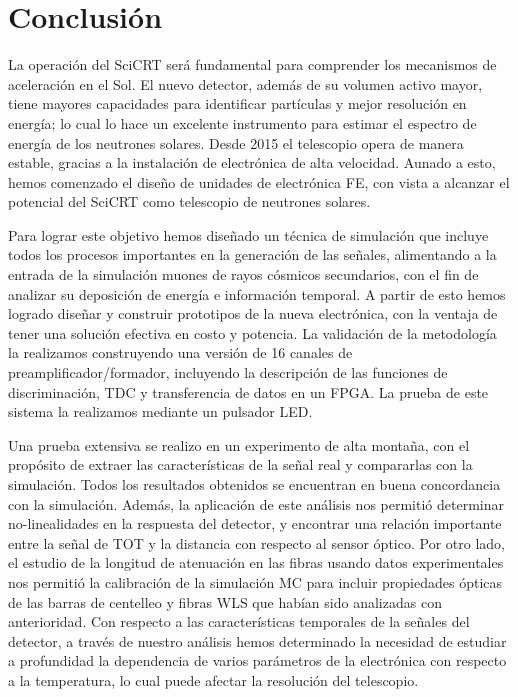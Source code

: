 
\chapter{Conclusión}

La operación del SciCRT será fundamental para comprender los mecanismos de aceleración en el Sol. El nuevo detector, además de su volumen activo mayor, tiene mayores capacidades para identificar partículas y mejor resolución en energía; lo cual lo hace un excelente instrumento para estimar el espectro de energía de los neutrones solares. Desde \num{2015} el telescopio opera de manera estable, gracias a la instalación de electrónica de alta velocidad. Aunado a esto, hemos comenzado el diseño de unidades de electrónica FE, con vista a alcanzar el potencial del SciCRT como telescopio de neutrones solares.

Para lograr este objetivo hemos diseñado un técnica de simulación que incluye todos los procesos importantes en la generación de las señales, alimentando a la entrada de la simulación muones de rayos cósmicos secundarios, con el fin de analizar su deposición de energía e información temporal. A partir de esto hemos logrado diseñar y construir prototipos de la nueva electrónica, con la ventaja de tener una solución efectiva en costo y potencia. La validación de la metodología la realizamos construyendo una versión de \num{16} canales de preamplificador/formador, incluyendo la descripción de las funciones de discriminación, TDC y transferencia de datos en un FPGA. La prueba de este sistema la realizamos mediante un pulsador LED.

Una prueba extensiva se realizo en un experimento de alta montaña, con el propósito de extraer las características de la señal real y compararlas con la simulación. Todos los resultados obtenidos se encuentran en buena concordancia con la simulación. Además, la aplicación de este análisis nos permitió determinar no-linealidades en la respuesta del detector, y encontrar una relación importante entre la señal de TOT y la distancia con respecto al sensor óptico. Por otro lado, el estudio de la longitud de atenuación en las fibras usando datos experimentales nos permitió la calibración de la simulación MC para incluir propiedades ópticas de las barras de centelleo y fibras WLS que habían sido analizadas con anterioridad. Con respecto a las características temporales de la señales del detector, a través de nuestro análisis hemos determinado la necesidad de estudiar a profundidad la dependencia de varios parámetros de la electrónica con respecto a la temperatura, lo cual puede afectar la resolución del telescopio.

